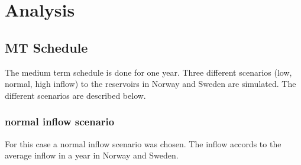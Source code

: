 \documentclass{article}
\begin{document}
\section{Analysis}

\subsection{MT Schedule}
The medium term schedule is done for one year. Three different scenarios (low, normal, high inflow) to the reservoirs in Norway and Sweden are simulated. The different scenarios are described below.

\subsubsection{normal inflow scenario}
For this case a normal inflow scenario was chosen. The inflow accords to the average inflow in a year in Norway and Sweden.
\end{document}
